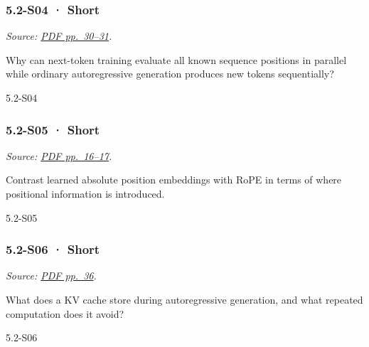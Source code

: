\noindent\begin{minipage}{\linewidth}

\subsubsection{5.2-S04 · Short}\label{s04-short-13}

\emph{Source:
\href{../Lecture\%20Slides/5.2.\%20Transformers.pdf\#page=30}{PDF
pp.~30--31}.}

Why can next-token training evaluate all known sequence positions in
parallel while ordinary autoregressive generation produces new tokens
sequentially?

\begin{solution}[20mm]{5.2-S04}

\end{solution}
\end{minipage}\par\medskip

\noindent\begin{minipage}{\linewidth}

\subsubsection{5.2-S05 · Short}\label{s05-short-13}

\emph{Source:
\href{../Lecture\%20Slides/5.2.\%20Transformers.pdf\#page=16}{PDF
pp.~16--17}.}

Contrast learned absolute position embeddings with RoPE in terms of
where positional information is introduced.

\begin{solution}[20mm]{5.2-S05}

\end{solution}
\end{minipage}\par\medskip

\noindent\begin{minipage}{\linewidth}

\subsubsection{5.2-S06 · Short}\label{s06-short-13}

\emph{Source:
\href{../Lecture\%20Slides/5.2.\%20Transformers.pdf\#page=36}{PDF
pp.~36}.}

What does a KV cache store during autoregressive generation, and what
repeated computation does it avoid?

\begin{solution}[20mm]{5.2-S06}

\end{solution}
\end{minipage}\par\medskip

